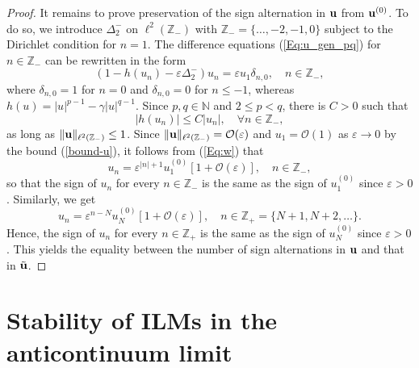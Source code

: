 \documentclass[12pt,reqno]{amsart}
\begin{document}
\begin{proof}
It remains to prove preservation of the sign alternation in ${\bf u}$ from ${\bf u}^{(0)}$. To do so, we introduce $\Delta_2^-$ on $\ell^2(\mathbb{Z}_-)$ 
with $\mathbb{Z}_- = \{ \dots, -2,-1,0\}$ subject to the Dirichlet condition for $n = 1$. The difference equations (\ref{Eq:u_gen_pq}) for $n \in \mathbb{Z}_-$ can be rewritten in the form 
\begin{equation}
(1 - h(u_n) - \varepsilon \Delta_2^-) u_n = \varepsilon u_1 \delta_{n,0}, \quad n \in \mathbb{Z}_-,
\label{Eq:w}
\end{equation}
where $\delta_{n,0} = 1$ for $n = 0$ and $\delta_{n,0} = 0$ for $n \leq -1$, whereas $h(u) = |u|^{p-1} - \gamma |u|^{q-1}$. Since $p,q \in \mathbb{N}$ and $2 \leq p < q$, there is $C > 0$ such that 
$$
|h(u_n)| \leq C |u_n|, \quad \forall n \in \mathbb{Z}_-,
$$
as long as $\|{\bf u} \|_{\ell^2(\mathbb{Z}_-)} \leq 1$. Since $\|{\bf u} \|_{\ell^2(\mathbb{Z}_-)} = \mathcal{O}(\varepsilon)$ and $u_1 = \mathcal{O}(1)$ as $\varepsilon \to 0$ by the bound (\ref{bound-u}), it follows from (\ref{Eq:w}) that 
$$
u_n = \varepsilon^{|n|+1} u_1^{(0)} \left[ 1 + \mathcal{O}(\varepsilon) \right], \quad n \in \mathbb{Z}_-,
$$
so that the sign of $u_n$ for every $n \in \mathbb{Z}_-$ is the same as the sign of $u_1^{(0)}$ since $\varepsilon > 0$. Similarly, we get 
$$
u_n = \varepsilon^{n-N} u_N^{(0)} \left[ 1 + \mathcal{O}(\varepsilon) \right], \quad n \in \mathbb{Z}_+ = \{ N+1,N+2,\dots\}.
$$
Hence, the sign of $u_n$ for every $n \in \mathbb{Z}_+$ is the same as the sign of $u_N^{(0)}$ since $\varepsilon > 0$. This yields the equality between the number of sign alternations in ${\bf u}$ and that in $\tilde{\bf u}$.
\end{proof}



\section{Stability of ILMs in the anticontinuum limit}
\label{Sec:StabilityACL}
\end{document}
